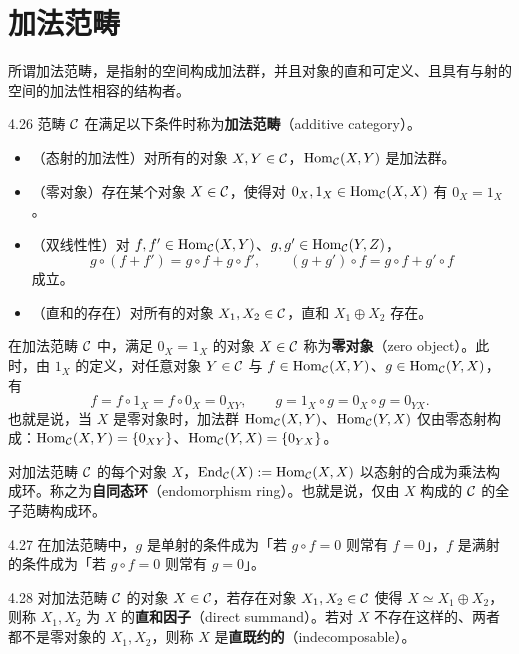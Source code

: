 \section{加法范畴}

所谓加法范畴，是指射的空间构成加法群，并且对象的直和可定义、且具有与射的空间的加法性相容的结构者。

\begin{definition}{4.26}
范畴 $\mathcal{C}$ 在满足以下条件时称为\textbf{加法范畴}（additive category）。
\begin{itemize}
  \item （态射的加法性）对所有的对象 $X,Y\in\mathcal{C}$，$\operatorname{Hom}_{\mathcal{C}}(X,Y)$ 是加法群。
  \item （零对象）存在某个对象 $X\in\mathcal{C}$，使得对 $0_X,1_X\in\operatorname{Hom}_{\mathcal{C}}(X,X)$ 有 $0_X=1_X$。
  \item （双线性性）对 $f,f'\in\operatorname{Hom}_{\mathcal{C}}(X,Y)$、$g,g'\in\operatorname{Hom}_{\mathcal{C}}(Y,Z)$，
        \[ g\circ(f+f')=g\circ f+g\circ f',\qquad (g+g')\circ f=g\circ f+g'\circ f \]
        成立。
  \item （直和的存在）对所有的对象 $X_1,X_2\in\mathcal{C}$，直和 $X_1\oplus X_2$ 存在。
\end{itemize}
\end{definition}

在加法范畴 $\mathcal{C}$ 中，满足 $0_X=1_X$ 的对象 $X\in\mathcal{C}$ 称为\textbf{零对象}（zero object）。此时，由 $1_X$ 的定义，对任意对象 $Y\in\mathcal{C}$ 与 $f\in\operatorname{Hom}_{\mathcal{C}}(X,Y)$、$g\in\operatorname{Hom}_{\mathcal{C}}(Y,X)$，有
\[ f=f\circ 1_X=f\circ 0_X=0_{XY},\qquad g=1_X\circ g=0_X\circ g=0_{YX}. \]
也就是说，当 $X$ 是零对象时，加法群 $\operatorname{Hom}_{\mathcal{C}}(X,Y)$、$\operatorname{Hom}_{\mathcal{C}}(Y,X)$ 仅由零态射构成：$\operatorname{Hom}_{\mathcal{C}}(X,Y)=\{0_{XY}\}$、$\operatorname{Hom}_{\mathcal{C}}(Y,X)=\{0_{YX}\}$。

对加法范畴 $\mathcal{C}$ 的每个对象 $X$，$\operatorname{End}_{\mathcal{C}}(X):=\operatorname{Hom}_{\mathcal{C}}(X,X)$ 以态射的合成为乘法构成环。称之为\textbf{自同态环}（endomorphism ring）。也就是说，仅由 $X$ 构成的 $\mathcal{C}$ 的全子范畴构成环。

\begin{remark}{4.27}
在加法范畴中，$g$ 是单射的条件成为「若 $g\circ f=0$ 则常有 $f=0$」，$f$ 是满射的条件成为「若 $g\circ f=0$ 则常有 $g=0$」。
\end{remark}

\begin{definition}{4.28}
对加法范畴 $\mathcal{C}$ 的对象 $X\in\mathcal{C}$，若存在对象 $X_1,X_2\in\mathcal{C}$ 使得 $X\simeq X_1\oplus X_2$，则称 $X_1,X_2$ 为 $X$ 的\textbf{直和因子}（direct summand）。若对 $X$ 不存在这样的、两者都不是零对象的 $X_1,X_2$，则称 $X$ 是\textbf{直既约的}（indecomposable）。
\end{definition}

